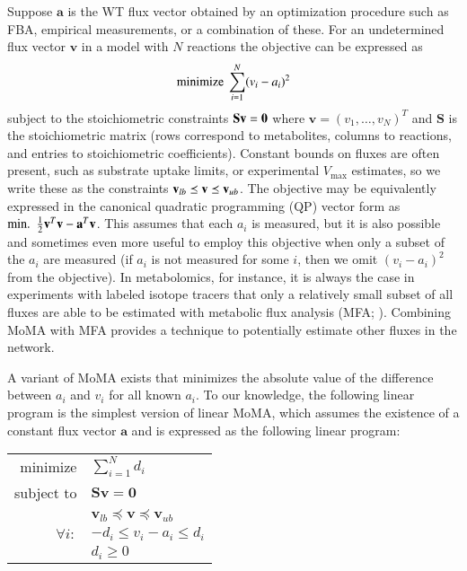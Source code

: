 Suppose $\mathbf{a}$ is the WT flux vector obtained by an optimization
procedure such as FBA, empirical measurements, or a combination of
these. For an undetermined flux vector $\mathbf{v}$ in a model with
$N$ reactions the objective can be expressed as
\[ \textnormal{minimize}\ \sum\limits_{i=1}^N (v_i-a_i)^2 \] 
subject to the stoichiometric constraints $\mathbf{S v}\nolinebreak
=\nolinebreak \mathbf{0}$ where $\mathbf{v} = (v_1, \ldots,
v_N)^T$ and $\mathbf{S}$ is the stoichiometric matrix (rows correspond
to metabolites, columns to reactions, and entries to stoichiometric
coefficients). Constant bounds on fluxes are often present, such as
substrate uptake limits, or experimental $V_{\max}$ estimates, so we
write these as the constraints $\mathbf{v}_{lb}\nolinebreak
\preceq\nolinebreak \mathbf{v}\nolinebreak \preceq \mathbf{v}_{ub}$.
The objective may be equivalently expressed in the canonical
quadratic programming (QP) vector form as
$\textnormal{min.\ }\ \frac{1}{2}\mathbf{v}^T \mathbf{v}\nolinebreak
-\nolinebreak \mathbf{a}^T \mathbf{v}$. This assumes that each $a_i$
is measured, but it is also possible and sometimes even more useful to
employ this objective when only a subset of the $a_i$ are measured (if
$a_i$ is not measured for some $i$, then we omit $(v_i-a_i)^2$ from
the objective). In metabolomics, for instance, it is always the case
in experiments with labeled isotope tracers that only a relatively
small subset of all fluxes are able to be estimated with metabolic
flux analysis (MFA; \citealt{Shestov2013a}). Combining MoMA with MFA
provides a technique to potentially estimate other fluxes in the
network.

A variant of MoMA exists that minimizes the absolute value of the
difference between $a_i$ and $v_i$ for all known $a_i$. To our
knowledge, the following linear program is the simplest version of
linear MoMA, which assumes the existence of a constant flux vector
$\mathbf{a}$ and is expressed as the following linear program:

\begin{center}
\begin{tabular}{rl}
minimize & $\sum\limits_{i=1}^N d_i$  \\
subject to & $\mathbf{S v} = \mathbf{0}$ \\
 & $\mathbf{v}_{lb} \preceq \mathbf{v} \preceq \mathbf{v}_{ub}$ \\
$\forall i:$ & $-d_i \le v_i-a_i \le d_i$ \\
 & $d_i \ge 0$
\end{tabular}
\end{center}

